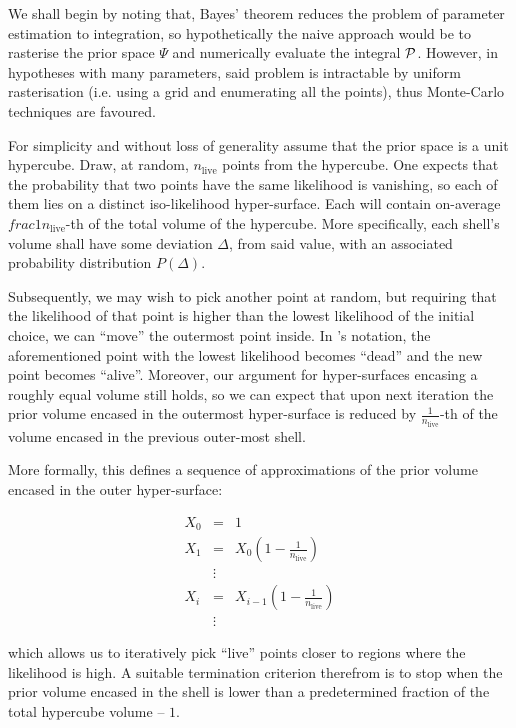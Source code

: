\documentclass[usenatbib]{mnras}
\begin{document}
We shall begin by noting that, Bayes' theorem reduces the problem
of parameter estimation to integration, so hypothetically the naive
approach would be to rasterise the prior space \(\Psi\) and
numerically evaluate the integral \({\cal P}\). However, in
hypotheses with many parameters, said problem is intractable by
uniform rasterisation (i.e. using a grid and enumerating all the
points), thus Monte-Carlo techniques are favoured.

For simplicity and without loss of generality assume that the prior
space is a unit hypercube. Draw, at random, \(n_\text{live}\)
points from the hypercube. One expects that the probability that
two points have the same likelihood is vanishing, so each of them
lies on a distinct iso-likelihood hyper-surface. Each will contain
on-average \(frac{1}{n_\text{live}}\)-th of the total volume of the
hypercube. More specifically, each shell's volume shall have some
deviation \(\Delta\), from said value, with an associated probability
distribution \(P(\Delta)\).

Subsequently, we may wish to pick another point at random, but
requiring that the likelihood of that point is higher than the
lowest likelihood of the initial choice, we can ``move'' the
outermost point inside. In \citeauthor{skilling2006} 's notation, the
aforementioned point with the lowest likelihood becomes ``dead''
and the new point becomes ``alive''. Moreover, our argument for
hyper-surfaces encasing a roughly equal volume still holds, so we
can expect that upon next iteration the prior volume encased in the
outermost hyper-surface is reduced by
\(\frac{1}{n_\text{live}}\)-th of the volume encased in the
previous outer-most shell.

More formally, this defines a sequence of approximations of the
prior volume encased in the outer hyper-surface:

\begin{equation}
  \begin{array}{rcl}
  X_{0} &=  &1 \\
  X_{1} &= &X_{0} \left(1- \frac{1}{n_\text{live}}\right)\\
  & \vdots & \\
  X_{i} &= &X_{i-1}\left(1- \frac{1}{n_\text{live}}\right)\\
  & \vdots &
\end{array}
\label{eq:recurrence-relation}
\end{equation}

which allows us to iteratively pick ``live'' points closer to
regions where the likelihood is high. A suitable termination
criterion therefrom is to stop when the prior volume encased in the
shell is lower than a predetermined fraction of the total hypercube
volume -- \(1\).
\end{document}
